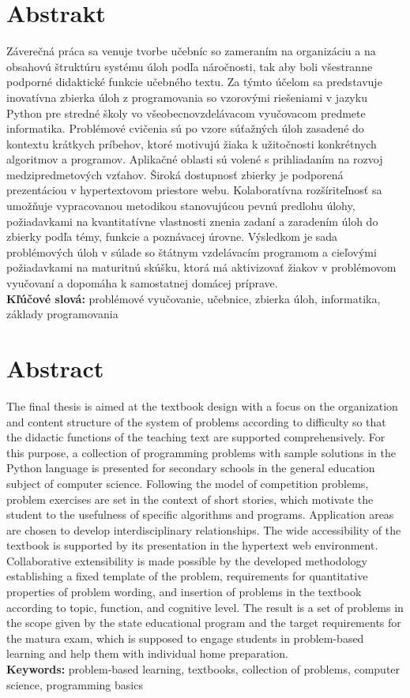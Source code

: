 \thispagestyle{empty}
\section*{Abstrakt}
Záverečná práca sa venuje tvorbe učebníc so zameraním na organizáciu a na obsahovú štruktúru systému úloh podľa náročnosti, tak aby boli všestranne podporné didaktické funkcie učebného textu. Za týmto účelom sa predstavuje inovatívna zbierka úloh z programovania so vzorovými riešeniami v jazyku Python pre stredné školy vo všeobecnovzdelávacom vyučovacom predmete informatika. Problémové cvičenia sú po vzore súťažných úloh zasadené do kontextu krátkych príbehov, ktoré motivujú žiaka k užitočnosti konkrétnych algoritmov a programov. Aplikačné oblasti sú volené s prihliadaním na rozvoj medzipredmetových vzťahov. Široká dostupnosť zbierky je podporená prezentáciou v hypertextovom priestore webu. Kolaboratívna rozšíriteľnosť sa umožňuje vypracovanou metodikou stanovujúcou pevnú predlohu úlohy, požiadavkami na kvantitatívne vlastnosti znenia zadaní a zaradením úloh do zbierky podľa témy, funkcie a poznávacej úrovne. Výsledkom je sada problémových úloh v súlade so štátnym vzdelávacím programom a cieľovými požiadavkami na maturitnú skúšku, ktorá má aktivizovať žiakov v problémovom vyučovaní a dopomáha k samostatnej domácej príprave. \\

\textbf{Kľúčové slová:} problémové vyučovanie, učebnice, zbierka úloh, informatika, základy programovania

\emptypage

\thispagestyle{empty}
\section*{Abstract}
The final thesis is aimed at the textbook design with a focus on the organization and content structure of the system of problems according to difficulty so that the didactic functions of the teaching text are supported comprehensively. For this purpose, a collection of programming problems with sample solutions in the Python language is presented for secondary schools in the general education subject of computer science. Following the model of competition problems, problem exercises are set in the context of short stories, which motivate the student to the usefulness of specific algorithms and programs. Application areas are chosen to develop interdisciplinary relationships. The wide accessibility of the textbook is supported by its presentation in the hypertext web environment.
Collaborative extensibility is made possible by the developed methodology establishing a fixed template of the problem, requirements for quantitative properties of problem wording, and insertion of problems in the textbook according to topic, function, and cognitive level. The result is a set of problems in the scope given by the state educational program and the target requirements for the matura exam, which is supposed to engage students in problem-based learning and help them with individual home preparation. \\

\textbf{Keywords:} problem-based learning, textbooks, collection of problems, computer science, programming basics
\emptypage 